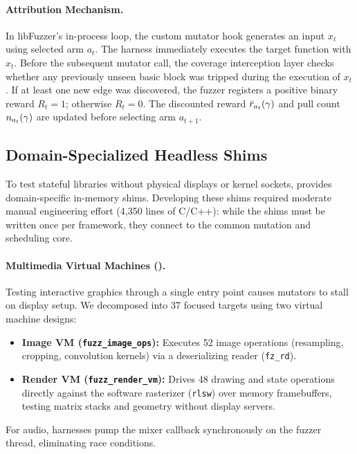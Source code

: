 \paragraph{Attribution Mechanism.}
In libFuzzer's in-process loop, the custom mutator hook generates an input $x_t$ using selected arm $a_t$.
The harness immediately executes the target function with $x_t$.
Before the subsequent mutator call, the coverage interception layer checks whether any previously unseen basic block was tripped during the execution of $x_t$.
If at least one new edge was discovered, the fuzzer registers a positive binary reward $R_t = 1$; otherwise $R_t = 0$.
The discounted reward $\bar{r}_{a_t}(\gamma)$ and pull count $n_{a_t}(\gamma)$ are updated before selecting arm $a_{t+1}$.

\subsection{Domain-Specialized Headless Shims}
\label{sec:shims}
To test stateful libraries without physical displays or kernel sockets, \tool provides domain-specific in-memory shims.
Developing these shims required moderate manual engineering effort (4{,}350 lines of C/C++): while the shims must be written once per framework, they connect to the common mutation and scheduling core.

\paragraph{Multimedia Virtual Machines (\raylib).}
Testing interactive graphics through a single entry point causes mutators to stall on display setup.
We decomposed \raylib into 37 focused targets using two virtual machine designs:
\begin{itemize}
  \item \textbf{Image VM (\texttt{fuzz\_image\_ops}):} Executes 52 image operations (resampling, cropping, convolution kernels) via a deserializing reader (\texttt{fz\_rd}).
  \item \textbf{Render VM (\texttt{fuzz\_render\_vm}):} Drives 48 drawing and state operations directly against the software rasterizer (\texttt{rlsw}) over memory framebuffers, testing matrix stacks and geometry without display servers.
\end{itemize}
For audio, harnesses pump the mixer callback synchronously on the fuzzer thread, eliminating race conditions.


